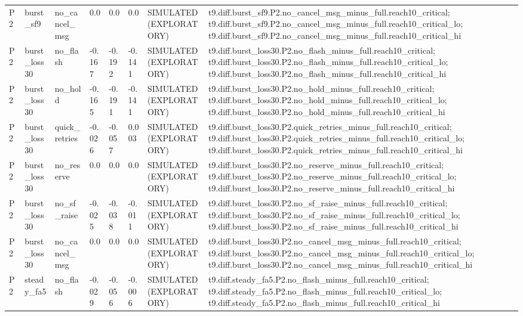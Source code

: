 \begin{table}[t]
\begin{tabular}{llllllll}
P2 & burst\_sf9 & no\_cancel\_msg & 0.0 & 0.0 & 0.0 & SIMULATED (EXPLORATORY) & t9.diff.burst\_sf9.P2.no\_cancel\_msg\_minus\_full.reach10\_critical; t9.diff.burst\_sf9.P2.no\_cancel\_msg\_minus\_full.reach10\_critical\_lo; t9.diff.burst\_sf9.P2.no\_cancel\_msg\_minus\_full.reach10\_critical\_hi \\
P2 & burst\_loss30 & no\_flash & -0.167 & -0.192 & -0.141 & SIMULATED (EXPLORATORY) & t9.diff.burst\_loss30.P2.no\_flash\_minus\_full.reach10\_critical; t9.diff.burst\_loss30.P2.no\_flash\_minus\_full.reach10\_critical\_lo; t9.diff.burst\_loss30.P2.no\_flash\_minus\_full.reach10\_critical\_hi \\
P2 & burst\_loss30 & no\_hold & -0.165 & -0.191 & -0.141 & SIMULATED (EXPLORATORY) & t9.diff.burst\_loss30.P2.no\_hold\_minus\_full.reach10\_critical; t9.diff.burst\_loss30.P2.no\_hold\_minus\_full.reach10\_critical\_lo; t9.diff.burst\_loss30.P2.no\_hold\_minus\_full.reach10\_critical\_hi \\
P2 & burst\_loss30 & quick\_retries & -0.026 & -0.057 & 0.003 & SIMULATED (EXPLORATORY) & t9.diff.burst\_loss30.P2.quick\_retries\_minus\_full.reach10\_critical; t9.diff.burst\_loss30.P2.quick\_retries\_minus\_full.reach10\_critical\_lo; t9.diff.burst\_loss30.P2.quick\_retries\_minus\_full.reach10\_critical\_hi \\
P2 & burst\_loss30 & no\_reserve & 0.0 & 0.0 & 0.0 & SIMULATED (EXPLORATORY) & t9.diff.burst\_loss30.P2.no\_reserve\_minus\_full.reach10\_critical; t9.diff.burst\_loss30.P2.no\_reserve\_minus\_full.reach10\_critical\_lo; t9.diff.burst\_loss30.P2.no\_reserve\_minus\_full.reach10\_critical\_hi \\
P2 & burst\_loss30 & no\_sf\_raise & -0.025 & -0.038 & -0.011 & SIMULATED (EXPLORATORY) & t9.diff.burst\_loss30.P2.no\_sf\_raise\_minus\_full.reach10\_critical; t9.diff.burst\_loss30.P2.no\_sf\_raise\_minus\_full.reach10\_critical\_lo; t9.diff.burst\_loss30.P2.no\_sf\_raise\_minus\_full.reach10\_critical\_hi \\
P2 & burst\_loss30 & no\_cancel\_msg & 0.0 & 0.0 & 0.0 & SIMULATED (EXPLORATORY) & t9.diff.burst\_loss30.P2.no\_cancel\_msg\_minus\_full.reach10\_critical; t9.diff.burst\_loss30.P2.no\_cancel\_msg\_minus\_full.reach10\_critical\_lo; t9.diff.burst\_loss30.P2.no\_cancel\_msg\_minus\_full.reach10\_critical\_hi \\
P2 & steady\_fa5 & no\_flash & -0.029 & -0.056 & -0.006 & SIMULATED (EXPLORATORY) & t9.diff.steady\_fa5.P2.no\_flash\_minus\_full.reach10\_critical; t9.diff.steady\_fa5.P2.no\_flash\_minus\_full.reach10\_critical\_lo; t9.diff.steady\_fa5.P2.no\_flash\_minus\_full.reach10\_critical\_hi \\

\end{tabular}
\end{table}
